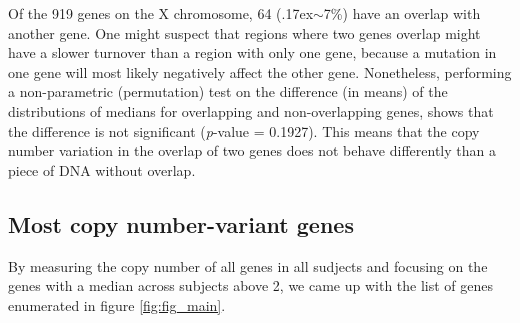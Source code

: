 \noindent Of the 919 genes on the X chromosome, 64 ({\raise.17ex\hbox{$\scriptstyle\sim$}}7\%) have an overlap with another gene. One might suspect that regions where two genes overlap might have a slower turnover than a region with only one gene, because a mutation in one gene will most likely negatively affect the other gene. Nonetheless, performing a non-parametric (permutation) test on the difference (in means) of the distributions of medians for overlapping and non-overlapping genes, shows that the difference is not significant (\textit{p}-value = 0.1927). This means that the copy number variation in the overlap of two genes does not behave differently than a piece of DNA without overlap. 




\subsection*{Most copy number-variant genes}

By measuring the copy number of all genes in all sudjects and focusing on the genes with a median across subjects above 2, we came up with the list of genes enumerated in figure \ref{fig:fig_main}.

